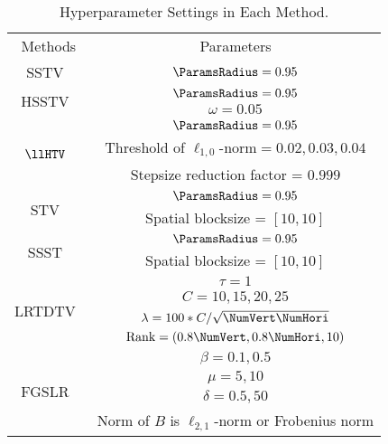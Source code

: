\begin{table}[!t]
	\begin{center}
		\caption{Hyperparameter Settings in Each Method.}
		\label{tab:HyperParam}
			\begin{tabular}{cc}
				\toprule
				Methods & Parameters \\
				\cmidrule(lr){1-2}
				SSTV~\cite{Aggarwal2016SSTV} 
				& $\ParamsRadius = 0.95$
				\vspace{1mm} \\
				
				
				\multirow{2}{*}{HSSTV~\cite{Takeyama2020HSSTV}} 
				& $\ParamsRadius = 0.95$ \\
				& $\omega = 0.05$ 
				\vspace{1mm} \\
				
				\multirow{3}{*}{$\llHTV$~\cite{Wang2021l0l1HTV}} 
				& $\ParamsRadius = 0.95$ \\
				& Threshold of $\ell_{1,0}\text{-norm} = 0.02, 0.03, 0.04$ \\
				& Stepsize reduction factor = $0.999$
		 		\vspace{1mm} \\
				
				
				\multirow{2}{*}{STV~\cite{Lefkimmiatis2015STV}} 
				& $\ParamsRadius = 0.95$ \\
				& Spatial blocksize = $[10, 10]$ 
				\vspace{1mm} \\
				
				
				\multirow{2}{*}{SSST~\cite{Kurihara2017SSST}} 
				& $\ParamsRadius = 0.95$ \\
				& Spatial blocksize = $[10, 10]$ 
				\vspace{1mm} \\
				
				
				\multirow{4}{*}{LRTDTV~\cite{Wang2018LRTDTV}} 
				& $\tau = 1$ \\
				& $C = 10, 15, 20, 25$ \\
				& $\lambda = 100 * C / \sqrt{\NumVert \NumHori}$ \\
				& $\text{Rank} = (0.8\NumVert, 0.8\NumHori, 10)$ 
				\vspace{1mm} \\
				
				
				\multirow{4}{*}{FGSLR~\cite{Chen2022FGSLR}} 
				& $\beta = 0.1, 0.5$ \\
				& $\mu = 5, 10$ \\
				& $\delta = 0.5, 50$\\
				& Norm of $B$ is $\ell_{2,1}$-norm or Frobenius norm
				\vspace{1mm} \\
				



\end{tabular}
\end{center}
\end{table}
